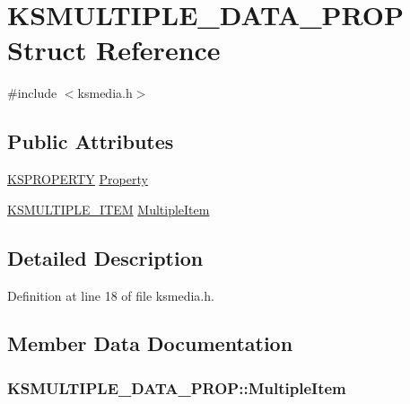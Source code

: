 \hypertarget{struct_k_s_m_u_l_t_i_p_l_e___d_a_t_a___p_r_o_p}{}\section{K\+S\+M\+U\+L\+T\+I\+P\+L\+E\+\_\+\+D\+A\+T\+A\+\_\+\+P\+R\+OP Struct Reference}
\label{struct_k_s_m_u_l_t_i_p_l_e___d_a_t_a___p_r_o_p}


{\ttfamily \#include $<$ksmedia.\+h$>$}

\subsection*{Public Attributes}
\begin{DoxyCompactItemize}
\item 
\hyperlink{ks_8h_a4392f77c74e868d813d46c39ada4d660}{K\+S\+P\+R\+O\+P\+E\+R\+TY} \hyperlink{struct_k_s_m_u_l_t_i_p_l_e___d_a_t_a___p_r_o_p_aea1743526fa697c77ca6477f7f2aa7fb}{Property}
\item 
\hyperlink{struct_k_s_m_u_l_t_i_p_l_e___i_t_e_m}{K\+S\+M\+U\+L\+T\+I\+P\+L\+E\+\_\+\+I\+T\+EM} \hyperlink{struct_k_s_m_u_l_t_i_p_l_e___d_a_t_a___p_r_o_p_aa59bbc23bc62b8c6f89e218ac989099e}{Multiple\+Item}
\end{DoxyCompactItemize}


\subsection{Detailed Description}


Definition at line 18 of file ksmedia.\+h.



\subsection{Member Data Documentation}
\subsubsection[{\texorpdfstring{Multiple\+Item}{MultipleItem}}]{ K\+S\+M\+U\+L\+T\+I\+P\+L\+E\+\_\+\+D\+A\+T\+A\+\_\+\+P\+R\+O\+P\+::\+Multiple\+Item}\hypertarget{struct_k_s_m_u_l_t_i_p_l_e___d_a_t_a___p_r_o_p_aa59bbc23bc62b8c6f89e218ac989099e}{}\label{struct_k_s_m_u_l_t_i_p_l_e___d_a_t_a___p_r_o_p_aa59bbc23bc62b8c6f89e218ac989099e}



